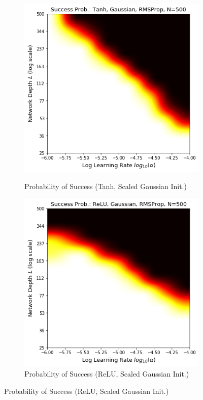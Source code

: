 \begin{figure}[h]
\centering
\newcommand{\myWidth}{0.28\textwidth}
\newcommand{\myspace}{\hspace{3mm}}
\begin{subfigure}{\myWidth}
  \centering
  \caption{Probability of Success (Tanh, Scaled Gaussian Init.)}
  \includegraphics[width=1.0\linewidth,trim={0 0 0 0.65cm},clip]{"s_tanh_normal_rmsprop"}
  \label{fig:mnist_rmsprop_s1}
\end{subfigure}\myspace%
\begin{subfigure}{\myWidth}
  \centering
  \caption{Probability of Success (ReLU, Scaled Gaussian Init.)}
  \includegraphics[width=1.0\linewidth,trim={0 0 0 0.65cm},clip]{"s_relu_normal_rmsprop"}

\end{subfigure}
\end{figure}
